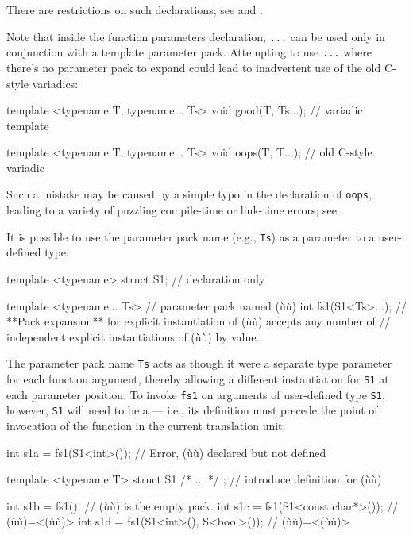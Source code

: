 \noindent There are restrictions on such declarations; see  and .

Note that inside the function parameters declaration, \lstinline!...! can
be used only in conjunction with a template parameter pack. Attempting
to use \lstinline!...! where there's no parameter pack to expand could lead
to inadvertent use of the old C-style variadics:

\begin{emcppslisting}
template <typename T, typename... Ts>
void good(T, Ts...);                   // variadic template

template <typename T, typename... Ts>
void oops(T, T...);                    // old C-style variadic
\end{emcppslisting}
    

\noindent Such a mistake may be caused by a simple typo in the declaration of
\lstinline!oops!, leading to a variety of puzzling compile-time or
link-time errors; see .

It is possible to use the parameter pack name (e.g., \lstinline!Ts!) as a
parameter to a user-defined type:

\begin{emcppslisting}
template <typename> struct S1;  // declaration only

template <typename... Ts>       // parameter pack named (ù{}ù)
int fs1(S1<Ts>...);
    // **Pack expansion** for explicit instantiation of (ù{}ù) accepts any number of
    // independent explicit instantiations of (ù{}ù) by value.
\end{emcppslisting}
    

\noindent The parameter pack name \lstinline!Ts! acts as though it were a separate
type parameter for each function argument, thereby allowing a different
instantiation for \lstinline!S1! at each parameter position. To invoke
\lstinline!fs1! on arguments of user-defined type \lstinline!S1!, however,
\lstinline!S1! will need to be a  --- i.e., its
definition must precede the point of invocation of the function in the
current translation unit:

\begin{emcppslisting}
int s1a = fs1(S1<int>());             // Error, (ù{}ù) declared but not defined

template <typename T>
struct S1 { /* ... */ };                // introduce definition for (ù{}ù)

int s1b = fs1();                      // (ù{}ù) is the empty pack.
int s1c = fs1(S1<const char*>());     // (ù{}ù)=<(ù{}ù)>
int s1d = fs1(S1<int>(), S<bool>());  // (ù{}ù)=<(ù{}ù)>
\end{emcppslisting}
    

